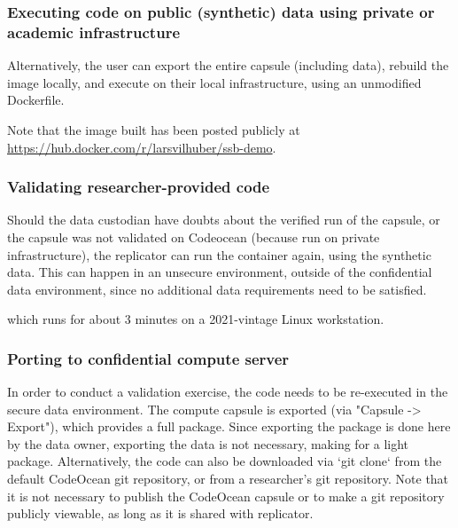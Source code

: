 \documentclass{article}
\begin{document}
\subsubsection{Executing code on public (synthetic) data using private or academic infrastructure}

Alternatively, the user can export the entire capsule (including data), rebuild the image locally, and execute on their local infrastructure, using an unmodified Dockerfile.


%
Note that the image built has been posted publicly at \url{https://hub.docker.com/r/larsvilhuber/ssb-demo}.


\subsubsection{Validating researcher-provided code}

Should the data custodian have doubts about the verified run of the capsule, or the capsule was not validated on Codeocean (because run on private infrastructure), the replicator can run the container again, using the synthetic data. This can happen in an unsecure environment, outside of the confidential data environment, since no additional data requirements need to be satisfied.





which runs for about 3 minutes on a 2021-vintage Linux workstation. 




\subsubsection{Porting to confidential compute server}

In order to conduct a validation exercise, the code needs to be re-executed in the secure data environment. The compute capsule is exported (via "Capsule -> Export"), which provides a full package. Since exporting the package is done here by the data owner, exporting the data is not necessary, making for a light package. Alternatively, the code can also be downloaded via `git clone` from the default CodeOcean git repository, or from a researcher's git repository. Note that it is not necessary to publish the CodeOcean capsule or to make a git repository publicly viewable, as long as it is shared with replicator.
\end{document}
